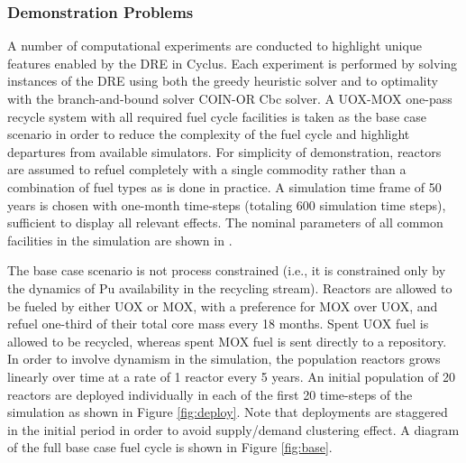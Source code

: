 
\subsubsection{Demonstration Problems}

A number of computational experiments are conducted to highlight unique
features enabled by the \gls{DRE} in Cyclus. Each experiment is performed by
solving instances of the \gls{DRE} using both the greedy heuristic solver and
to optimality with the branch-and-bound solver \gls{COIN-OR} Cbc solver. A
UOX-MOX one-pass recycle system with all required fuel cycle facilities is
taken as the base case scenario in order to reduce the complexity of the fuel
cycle and highlight departures from available simulators. For simplicity of
demonstration, reactors are assumed to refuel completely with a single
commodity rather than a combination of fuel types as is done in practice. A
simulation time frame of 50 years is chosen with one-month time-steps
(totaling 600 simulation time steps), sufficient to display all relevant
effects. The nominal parameters of all common facilities in the simulation are
shown in \cite{gidden_dre_2016}.

The base case scenario is not process constrained (i.e., it is constrained only
by the dynamics of Pu availability in the recycling stream). Reactors are
allowed to be fueled by either UOX or MOX, with a preference for MOX over UOX,
and refuel one-third of their total core mass every 18 months. Spent UOX fuel is
allowed to be recycled, whereas spent MOX fuel is sent directly to a
repository. In order to involve dynamism in the simulation, the population
reactors grows linearly over time at a rate of 1 reactor every 5 years. An
initial population of 20 reactors are deployed individually in each of the first
20 time-steps of the simulation as shown in Figure \ref{fig:deploy}. Note that
deployments are staggered in the initial period in order to avoid supply/demand
clustering effect. A diagram of the full base case fuel cycle is shown in Figure
\ref{fig:base}.

